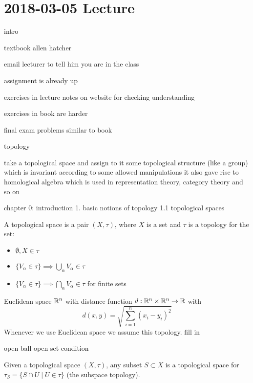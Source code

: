 \section{2018-03-05 Lecture}

intro

textbook allen hatcher

email lecturer to tell him you are in the class

assignment is already up

exercises in lecture notes on website for checking understanding

exercises in book are harder

final exam problems similar to book

topology

take a topological space and assign to it some topological structure (like a group) which is invariant according to some allowed manipulations
it also gave rise to homological algebra which is used in representation theory, category theory and so on

chapter 0: introduction
1. basic notions of topology
1.1 topological spaces

\begin{defn}
	A topological space is a pair $(X,\tau)$, where $X$ is a set and $\tau$ is a topology for the set:
	\begin{itemize}
		\item $\emptyset, X \in \tau$
		\item $\{V_\alpha \in \tau\} \implies \bigcup_\alpha V_\alpha \in \tau$
		\item $\{V_\alpha \in \tau\} \implies \bigcap_\alpha V_\alpha \in \tau$ for finite sets
	\end{itemize}
\end{defn}

\begin{exam}
	Euclidean space $\mathbb{R}^n$ with distance function $d: \mathbb{R}^n \times \mathbb{R}^n \to \mathbb{R}$ with
	\[d(x,y) = \sqrt{\sum_{i=1}^n(x_i-y_i)^2}\]
	\[\]
	Whenever we use Euclidean space we assume this topology. fill in
	
	open ball
	open set condition
\end{exam}

\begin{defn}
	Given a topological space $(X,\tau)$, any subset $S \subset X$ is a topological space for $\tau_S = \{S \cap U \mid U \in \tau\}$ (the subspace topology).
\end{defn}

